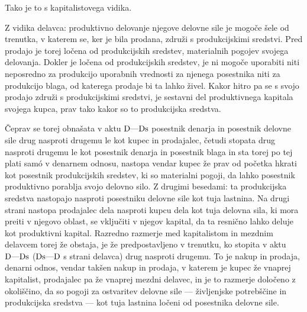 \documentclass[kapital_02.tex]{subfiles}
\begin{document}
Tako je to s kapitalistovega vidika.

Z vidika delavca: produktivno delovanje njegove delovne sile je mogoče šele od trenutka, v katerem se, ker je bila prodana, združi s produkcijskimi sredstvi. Pred prodajo je torej ločena od produkcijskih sredstev, materialnih pogojev svojega delovanja. Dokler je ločena od produkcijskih sredstev, je ni mogoče uporabiti niti neposredno za produkcijo uporabnih vrednosti za njenega posestnika niti za produkcijo blaga, od katerega prodaje bi ta lahko živel. Kakor hitro pa se s svojo prodajo združi s produkcijskimi sredstvi, je sestavni del produktivnega kapitala svojega kupca, prav tako kakor so to produkcijska sredstva.

Čeprav se torej obnašata v aktu \( \textrm{D}\textrm{---}\textrm{Ds} \) posestnik denarja in posestnik delovne sile drug nasproti drugemu le kot kupec in prodajalec, četudi stopata drug nasproti drugemu le kot posestnik denarja in posestnik blaga in sta torej po tej plati sam\'o v denarnem odnosu, nastopa vendar kupec že prav od početka hkrati kot posestnik produkcijskih sredstev, ki so materialni pogoji, da lahko posestnik produktivno porablja svojo delovno silo. Z drugimi besedami: ta produkcijska sredstva nastopajo nasproti posestniku delovne sile kot tuja lastnina. Na drugi strani nastopa prodajalec dela nasproti kupcu dela kot tuja delovna sila, ki mora preiti v njegovo oblast, se vključiti v njegov kapital, da ta resnično lahko deluje kot produktivni kapital. Razredno razmerje med kapitalistom in mezdnim delavcem torej že obstaja, je že predpostavljeno v trenutku, ko stopita v aktu \( \textrm{D}\textrm{---}\textrm{Ds} \) (\( \textrm{Ds}\textrm{---}\textrm{D} \) s strani delavca) drug nasproti drugemu. To je nakup in prodaja, denarni odnos, vendar takšen nakup in prodaja, v katerem je kupec že vnaprej kapitalist, prodajalec pa že vnaprej mezdni delavec, in je to razmerje določeno z okoliščino, da so pogoji za ostvaritev delovne sile --- življenjske potrebščine in produkcijska sredstva --- kot tuja lastnina ločeni od posestnika delovne sile.
\end{document}
